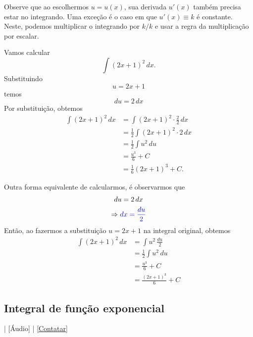 Observe que ao escolhermos $u = u(x)$, sua derivada $u'(x)$ também precisa estar no integrando. Uma exceção é o caso em que $u'(x)\equiv k$ é constante. Neste, podemos multiplicar o integrando por $k/k$ e usar a regra da multiplicação por escalar.

\begin{ex}
  Vamos calcular
  \begin{equation}
    \int (2x+1)^2\,dx.
  \end{equation}
  Substituindo
  \begin{equation}
    u = 2x+1
  \end{equation}
  temos
  \begin{equation}
    du = 2\,dx
  \end{equation}
  Por substituição, obtemos
  \begin{align}
    \int (2x+1)^2\,dx &= \int (2x+1)^2\cdot \frac{2}{2}\,dx\\
                      &= \frac{1}{2}\int (2x+1)^2\cdot 2\,dx\\
                     &= \frac{1}{2}\int u^2\,du\\
                     &= \frac{u^3}{6} + C\\
                     &= \frac{1}{6}(2x+1)^3 + C.
  \end{align}

  Outra forma equivalente de calcularmos, é observarmos que
  \begin{gather}
    du = 2\,dx \\
    \Rightarrow {\color{blue}dx = \frac{du}{2}}
  \end{gather}
  Então, ao fazermos a substituição $u = 2x+1$ na integral original, obtemos
  \begin{align}
    \int (2x+1)^2\,dx &= \int u^2\,\frac{du}{2}\\
                      &= \frac{1}{2}\int u^2\,du\\
                      &= \frac{u^3}{6} + C\\
                      &= \frac{(2x+1)^3}{6} + C
  \end{align}
\end{ex}


\subsection{Integral de função exponencial}

\begin{flushright}
  [Vídeo] | [Áudio] | \href{https://phkonzen.github.io/notas/contato.html}{[Contatar]}
\end{flushright}

